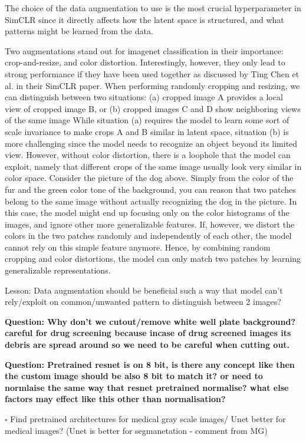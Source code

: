 \documentclass[12pt,twoside,a4paper,parskip]{scrbook} %
\begin{document}
The choice of the data augmentation to use is the most crucial hyperparameter in SimCLR since it directly affects how the latent space is structured, and what patterns might be learned from the data.

Two augmentations stand out for imagenet classification in their importance: crop-and-resize, and color distortion. Interestingly, however, they only lead to strong performance if they have been used together as discussed by Ting Chen et al. in their SimCLR paper. When performing randomly cropping and resizing, we can distinguish between two situations: (a) cropped image A provides a local view of cropped image B, or (b) cropped images C and D show neighboring views of the same image
While situation (a) requires the model to learn some sort of scale invariance to make crops A and B similar in latent space, situation (b) is more challenging since the model needs to recognize an object beyond its limited view. However, without color distortion, there is a loophole that the model can exploit, namely that different crops of the same image usually look very similar in color space. Consider the picture of the dog above. Simply from the color of the fur and the green color tone of the background, you can reason that two patches belong to the same image without actually recognizing the dog in the picture. In this case, the model might end up focusing only on the color histograms of the images, and ignore other more generalizable features. If, however, we distort the colors in the two patches randomly and independently of each other, the model cannot rely on this simple feature anymore. Hence, by combining random cropping and color distortions, the model can only match two patches by learning generalizable representations.

Lesson: Data augmentation should be beneficial such a way that model can't rely/exploit on common/unwanted pattern to distinguish between 2 images?

\textbf{Question: Why don't we cutout/remove white well plate background? careful for drug screening because incase of drug screened images its debris are spread around so we need to be careful when cutting out.}

\textbf{Question: Pretrained resnet is on 8 bit, is there any concept like then the custom image should be also 8 bit to match it? or need to normlaise the same way that resnet pretrained normalise? what else factors may effect like this other than normalisation? } 

$\square$ Find pretrained architectures for medical gray scale images/ Unet better for medical images? (Unet is better for segmanetation - comment from MG)
\end{document}
